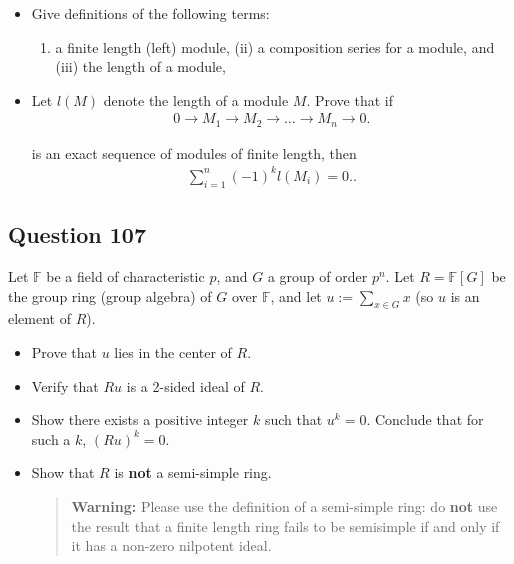 \documentclass[12pt]{article}
\providecommand{\tightlist}{%
  \setlength{\itemsep}{0pt}\setlength{\parskip}{0pt}}
\begin{document}
\begin{itemize}
\item
  Give definitions of the following terms:

  \begin{enumerate}
  \def\labelenumi{(\roman{enumi})}
  \tightlist
  \item
    a finite length (left) module, (ii) a composition series for a
    module, and (iii) the length of a module,
  \end{enumerate}
\item
  Let \(l(M)\) denote the length of a module \(M\). Prove that if
  \begin{align*}
  0\rightarrow M_1\rightarrow M_2\rightarrow\dots\rightarrow
  M_n\rightarrow 0
  .\end{align*}

  is an exact sequence of modules of finite length, then \begin{align*}
  \sum_{i=1}^n(-1)^kl(M_i)=0.
  .\end{align*}
\end{itemize}

\hypertarget{question-107}{%
\subsection{Question 107}\label{question-107}}

Let \(\mathbb F\) be a field of characteristic \(p\), and \(G\) a group
of order \(p^n\). Let \(R=\mathbb F[G]\) be the group ring (group
algebra) of \(G\) over \(\mathbb F\), and let \(u:=\sum_{x\in G}x\) (so
\(u\) is an element of \(R\)).

\begin{itemize}
\item
  Prove that \(u\) lies in the center of \(R\).
\item
  Verify that \(Ru\) is a 2-sided ideal of \(R\).
\item
  Show there exists a positive integer \(k\) such that \(u^k=0\).
  Conclude that for such a \(k\), \((Ru)^k=0\).
\item
  Show that \(R\) is \textbf{not} a semi-simple ring.

  \begin{quote}
  \textbf{Warning:} Please use the definition of a semi-simple ring: do
  \textbf{not} use the result that a finite length ring fails to be
  semisimple if and only if it has a non-zero nilpotent ideal.
  \end{quote}
\end{itemize}
\end{document}
